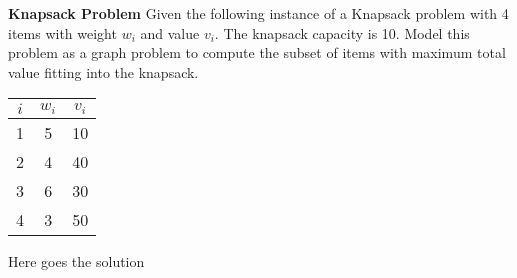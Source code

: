 \question \textbf{Knapsack Problem}
Given the following instance of a Knapsack problem with 4 items with weight $w_i$ and value $v_i$. The knapsack capacity is 10. Model this problem as a graph problem to compute the subset of items with maximum total value fitting into the knapsack.

\begin{tabular}{c | c | c}
    $i$ & $w_i$ & $v_i$ \\
    \hline
    1 & 5 & 10 \\
    2 & 4 & 40 \\
    3 & 6 & 30 \\
    4 & 3 & 50
    \end{tabular}

\begin{solution}
Here goes the solution
\end{solution}